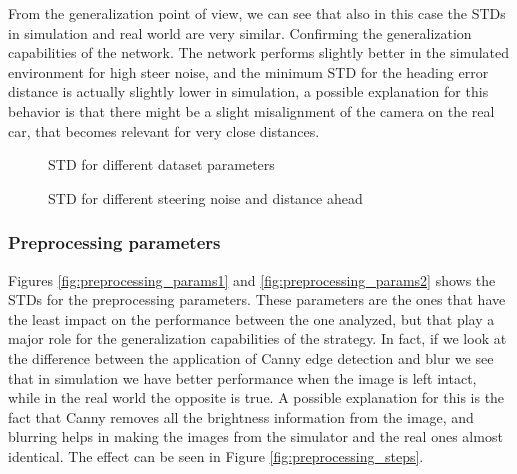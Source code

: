 \documentclass[a4paper,12pt,sort&compress]{article}
\begin{document}
    From the generalization point of view, we can see that also in this case the STDs in simulation
    and real world are very similar. Confirming the generalization capabilities of the network. The
    network performs slightly better in the simulated environment for high steer noise, and the
    minimum STD for the heading error distance is actually slightly lower in simulation, a possible
    explanation for this behavior is that there might be a slight misalignment of the camera on the
    real car, that becomes relevant for very close distances.

    \begin{figure}
        \centering
        \begin{subfigure}[b]{\textwidth}
            \centering
        \end{subfigure}
        \begin{subfigure}[b]{\textwidth}
            \centering
        \end{subfigure}
        \caption{STD for different dataset parameters}
        \label{fig:ds_parameters}
    \end{figure}

    \begin{figure}
        \centering
        \caption{STD for different steering noise and distance ahead}
        \label{fig:3d_noise_dist}
    \end{figure}

\clearpage

\subsubsection*{Preprocessing parameters}
    Figures \ref{fig:preprocessing_params1} and \ref*{fig:preprocessing_params2} shows the STDs for
    the preprocessing parameters.
    These parameters are the ones that have the least impact on the performance between
    the one analyzed, but that play a major role for the generalization capabilities of the
    strategy. In fact, if we look at the difference between the application of Canny edge detection
    and blur we see that in simulation we have better performance when the image is left intact,
    while in the real world the opposite is true. A possible explanation for this is the fact that
    Canny removes all the brightness information from the image, and blurring helps in making the
    images from the simulator and the real ones almost identical. The effect can be seen in Figure \ref*{fig:preprocessing_steps}.
    
\end{document}

